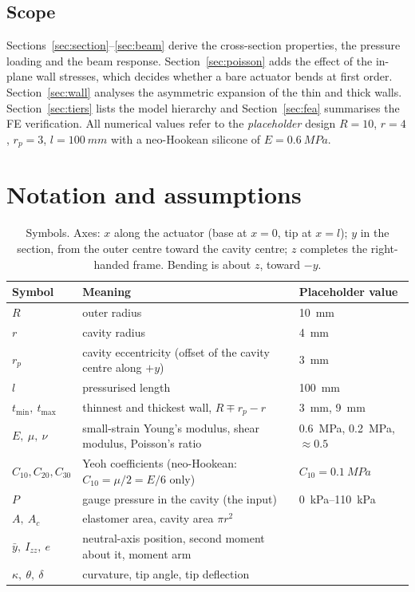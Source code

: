 \documentclass[11pt,a4paper]{article}
\numberwithin{equation}{section}
\newcommand{\Izz}{I_{zz}}
\newcommand{\rp}{r_p}
\newcommand{\tmin}{t_{\min}}
\newcommand{\tmax}{t_{\max}}
\begin{document}
\subsection{Scope}
Sections~\ref{sec:section}--\ref{sec:beam} derive the cross-section properties, the pressure loading and the
beam response. Section~\ref{sec:poisson} adds the effect of the in-plane wall stresses, which decides whether
a bare actuator bends at first order. Section~\ref{sec:wall} analyses the asymmetric expansion of the
thin and thick walls. Section~\ref{sec:tiers} lists the model hierarchy and
Section~\ref{sec:fea} summarises the FE verification. All numerical values refer to the
\emph{placeholder} design $R=10$, $r=4$, $\rp=3$, $l=\SI{100}{mm}$ with a neo-Hookean silicone of $E=\SI{0.6}{MPa}$.

\section{Notation and assumptions}

\begin{table}[H]
\centering\small
\begin{tabular}{@{}lll@{}}
\toprule
Symbol & Meaning & Placeholder value \\
\midrule
$R$ & outer radius & \SI{10}{mm}\\
$r$ & cavity radius & \SI{4}{mm}\\
$\rp$ & cavity eccentricity (offset of the cavity centre along $+y$) & \SI{3}{mm}\\
$l$ & pressurised length & \SI{100}{mm}\\
$\tmin,\ \tmax$ & thinnest and thickest wall, $R\mp\rp-r$ & \SI{3}{mm}, \SI{9}{mm}\\
$E,\ \mu,\ \nu$ & small-strain Young's modulus, shear modulus, Poisson's ratio & \SI{0.6}{MPa}, \SI{0.2}{MPa}, $\approx 0.5$\\
$C_{10},C_{20},C_{30}$ & Yeoh coefficients (neo-Hookean: $C_{10}=\mu/2=E/6$ only) & $C_{10}=\SI{0.1}{MPa}$\\
$P$ & gauge pressure in the cavity (the input) & \SIrange{0}{110}{kPa}\\
$A,\ A_c$ & elastomer area, cavity area $\pi r^2$ & \\
$\bar y,\ \Izz,\ e$ & neutral-axis position, second moment about it, moment arm & \\
$\kappa,\ \theta,\ \delta$ & curvature, tip angle, tip deflection & \\
\bottomrule
\end{tabular}
\caption{Symbols. Axes: $x$ along the actuator (base at $x=0$, tip at $x=l$); $y$ in the section, from the
outer centre toward the cavity centre; $z$ completes the right-handed frame. Bending is about $z$, toward $-y$.}
\end{table}
\end{document}
